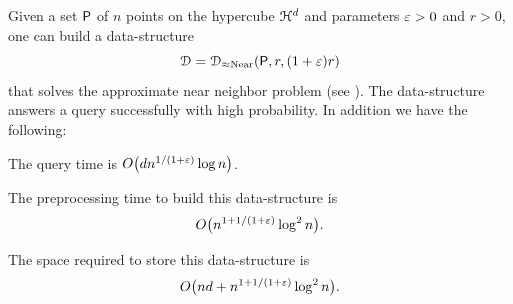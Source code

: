 \begin{theorem}
    Given a set ${\mathsf{P}}$ of $n$ points on the hypercube
    $\EuScript{H}^d$ and parameters ${\varepsilon}>0$ and $r > 0$, one can
    build a data-structure
    \[
    \DS = \DSAprxNearNbr(\PntSet,r,(1+\eps)r)
    \]
    that solves the approximate near neighbor problem (see
    ).  The data-structure answers a query
    successfully with high probability. In addition we have the
    following:
    \begin{compactenumA}
        \smallskip%
        \item The query time is
        $O\bigl(d n^{1/(1+{\varepsilon})} \log n \bigr)$.

        \smallskip%
        \item The preprocessing time to build this data-structure is
        \[
        O\bigl(n^{1+1/(1+{\varepsilon})} \log^2 n \bigr).
        \]

        \smallskip%
        \item The space required to store this data-structure is
        \[
        O\bigl(nd + n^{1+1/(1+{\varepsilon})} \log^2 n \bigr).
        \]
    \end{compactenumA}
\end{theorem}
